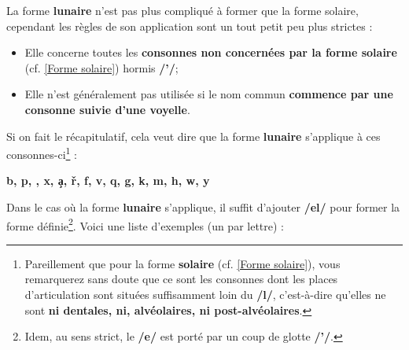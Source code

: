 \label{Forme lunaire}
La forme \textbf{lunaire} n'est pas plus compliqué à former que la forme solaire, cependant les règles de son application sont un tout petit peu plus strictes : 
\begin{itemize}
    \item Elle concerne toutes les \textbf{consonnes non concernées par la forme solaire} (cf. \ref{Forme solaire}) hormis \textbf{/'/};
    \item Elle n'est généralement pas utilisée si le nom commun \textbf{commence par une consonne suivie d'une voyelle}.
\end{itemize}

Si on fait le récapitulatif, cela veut dire que la forme \textbf{lunaire} s'applique à ces consonnes-ci\footnote{Pareillement que pour la forme \textbf{solaire} (cf. \ref{Forme solaire}), vous remarquerez sans doute que ce sont les consonnes dont les places d'articulation sont situées suffisamment loin du \textbf{/l/}, c'est-à-dire qu'elles ne sont \textbf{ni dentales, ni, alvéolaires, ni post-alvéolaires}.} : 

\begin{center}
    \textbf{
    b, p, \textcrh, x, \c{a}, \v{r}, f, v, q, g, k, m, h, w, y
    }
\end{center}

Dans le cas où la forme \textbf{lunaire} s'applique, il suffit d'ajouter \textbf{/el/} pour former la forme définie\footnote{Idem, au sens strict, le \textbf{/e/} est porté par un coup de glotte \textbf{/'/}.}. Voici une liste d'exemples (un par lettre) :

